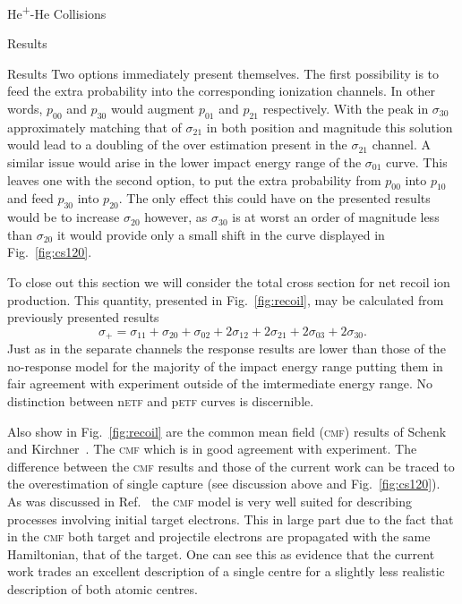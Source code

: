 \documentclass[letterpaper, 11 pt]{report}
\begin{document}
\begin{chapter}{\texorpdfstring{He\textsuperscript{+}}{He+}-He Collisions \label{chap:hephe}}
\begin{section}{Results \label{sec:hephe-disc}}
\begin{subsection}{Results \label{sec:hephe-res}}
         Two options immediately present themselves. The first possibility is to feed the extra
         probability into the corresponding ionization channels. In other words, $p_{00}$ and $p_{30}$
         would augment $p_{01}$ and $p_{21}$ respectively. With the peak in $\sigma_{30}$ approximately
         matching that of $\sigma_{21}$ in both position and magnitude this solution would lead to a
         doubling of the over estimation present in the $\sigma_{21}$ channel. A similar issue would
         arise in the lower impact energy range of the $\sigma_{01}$ curve. This leaves one with the
         second option, to put the extra probability from $p_{00}$ into $p_{10}$ and feed $p_{30}$ into
         $p_{20}$. The only effect this could have on the presented results would be to increase
         $\sigma_{20}$ however, as $\sigma_{30}$ is at worst an order of magnitude less than
         $\sigma_{20}$ it would provide only a small shift in the curve displayed in
         Fig.~\ref{fig:cs120}.

         To close out this section we will consider the total cross section for net recoil ion
         production. This quantity, presented in Fig.~\ref{fig:recoil}, may be calculated from
         previously presented results
         \begin{equation}
            \sigma_{+} = \sigma_{11} + \sigma_{20} + \sigma_{02} + 2 \sigma_{12} + 2 \sigma_{21}
                                     + 2 \sigma_{03} + 2 \sigma_{30}.
         \end{equation}
         Just as in the separate channels the response results are lower than those of the no-response
         model for the majority of the impact energy range putting them in fair agreement with
         experiment outside of the imtermediate energy range. No distinction between n\textsc{etf} and
         p\textsc{etf} curves is discernible.

         Also show in Fig.~\ref{fig:recoil} are the common mean field (\textsc{cmf}) results of Schenk
         and Kirchner~\cite{geraldDiss}. The \textsc{cmf} which is in good agreement with experiment.
         The difference between the \textsc{cmf} results and those of the current work can be traced to
         the overestimation of single capture (see discussion above and Fig.~\ref{fig:cs120}). As was
         discussed in Ref.~\cite{geraldDiss} the \textsc{cmf} model is very well suited for describing
         processes involving initial target electrons. This in large part due to the fact that in the
         \textsc{cmf} both target and projectile electrons are propagated with the same Hamiltonian,
         that of the target. One can see this as evidence that the current work trades an excellent
         description of a single centre for a slightly less realistic description of both atomic
         centres.


\end{subsection}
\end{section}
\end{chapter}
\end{document}
